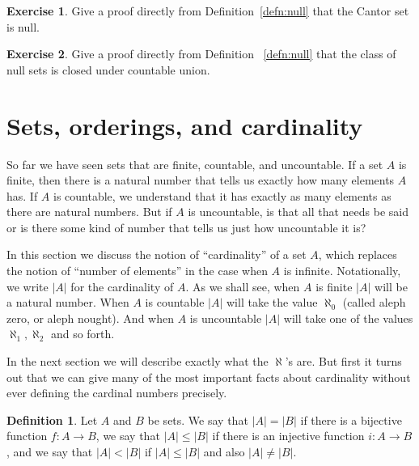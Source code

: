 \documentclass[11pt,oneside]{amsart}
\theoremstyle{definition}
\newtheorem{exerc}{Exercise}[section]
\theoremstyle{definition}
\newtheorem{defn}[thm]{Definition}
\theoremstyle{remark}
\begin{document}
\begin{exerc}
  Give a proof directly from Definition~\ref{defn:null} that the Cantor set is null.
\end{exerc}

\begin{exerc}
  Give a proof directly from Definition ~\ref{defn:null} that the class of null sets is closed under countable union.
\end{exerc}


\section{Sets, orderings, and cardinality}

So far we have seen sets that are finite, countable, and uncountable. If a set $A$ is finite, then there is a natural number that tells us exactly how many elements $A$ has. If $A$ is countable, we understand that it has exactly as many elements as there are natural numbers. But if $A$ is uncountable, is that all that needs be said or is there some kind of number that tells us just how uncountable it is?

In this section we discuss the notion of ``cardinality'' of a set $A$, which replaces the notion of ``number of elements'' in the case when $A$ is infinite. Notationally, we write $|A|$ for the cardinality of $A$. As we shall see, when $A$ is finite $|A|$ will be a natural number. When $A$ is countable $|A|$ will take the value $\aleph_0$ (called aleph zero, or aleph nought). And when $A$ is uncountable $|A|$ will take one of the values $\aleph_1,\aleph_2$ and so forth.

In the next section we will describe exactly what the $\aleph$'s are. But first it turns out that we can give many of the most important facts about cardinality without ever defining the cardinal numbers precisely.

\begin{defn}
  \label{defn:cardinal-rel}
  Let $A$ and $B$ be sets. We say that $|A|=|B|$ if there is a bijective function $f\colon A\to B$, we say that $|A|\leq|B|$ if there is an injective function $i\colon A\to B$, and we say that $|A|<|B|$ if $|A|\leq|B|$ and also $|A|\neq|B|$.
\end{defn}
\end{document}
